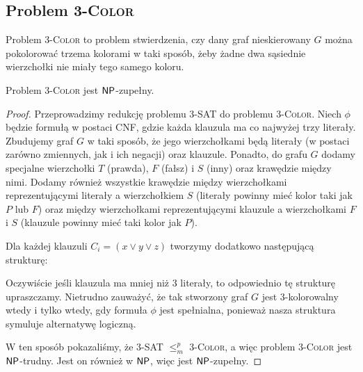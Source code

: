 \subsection{Problem 3-\textsc{Color}}

Problem 3-\textsc{Color} to problem stwierdzenia, czy dany graf nieskierowany $G$ można pokolorować trzema kolorami w taki sposób, żeby żadne dwa sąsiednie wierzchołki nie miały tego samego koloru.

\begin{theorem}\label{t:3-Color}
    Problem 3-\textsc{Color} jest $\textsf{NP}$-zupełny.
\end{theorem}
\begin{proof}
    Przeprowadzimy redukcję problemu 3-SAT do problemu 3-\textsc{Color}. Niech $\phi$ będzie formułą w postaci CNF, gdzie każda klauzula ma co najwyżej trzy literały. Zbudujemy graf $G$ w taki sposób, że jego wierzchołkami będą literały (w postaci zarówno zmiennych, jak i ich negacji) oraz klauzule.
    Ponadto, do grafu $G$ dodamy specjalne wierzchołki $T$ (prawda), $F$ (fałsz) i $S$ (inny) oraz krawędzie między nimi. Dodamy również wszystkie krawędzie między wierzchołkami reprezentującymi literały a wierzchołkiem $S$ (literały powinny mieć kolor taki jak $P$ lub $F$) oraz między wierzchołkami reprezentującymi klauzule a wierzchołkami $F$ i $S$ (klauzule powinny mieć taki kolor jak $P$).

    Dla każdej klauzuli $C_i = (x \lor y \lor z)$ tworzymy dodatkowo następującą strukturę:
    \begin{figure}[H]
        \centering
    \end{figure}

    Oczywiście jeśli klauzula ma mniej niż $3$ literały, to odpowiednio tę strukturę upraszczamy.
    Nietrudno zauważyć, że tak stworzony graf $G$ jest 3-kolorowalny wtedy i tylko wtedy, gdy formuła $\phi$ jest spełnialna, ponieważ nasza struktura symuluje alternatywę logiczną.

    W ten sposób pokazaliśmy, że 3-SAT $\leq_m^p$ 3-\textsc{Color}, a więc problem 3-\textsc{Color} jest $\textsf{NP}$-trudny. Jest on również w $\textsf{NP}$, więc jest $\textsf{NP}$-zupełny.
\end{proof}

